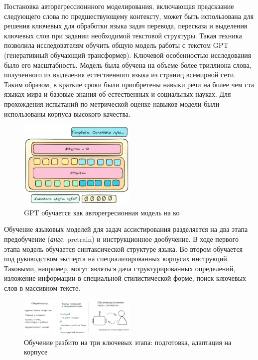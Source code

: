 Постановка авторегрессионнного моделирования, включающая предскзание следующего слова по предшествующему контексту,
может быть использована для решения ключевых для обработки языка задач перевода, пересказа и выделения ключевых слов
при задании необходимой текстовой структуры. Такая техника позволила исследователям \cite{radford2021learning} обучить
общую модель работы с текстом GPT (генеративный обучающий трансформер). Ключевой особенностью исследования было его
масштабность. Модель была обучена на объеме более триллиона слова, полученного из выделения естественного языка из страниц всемирной сети.
Таким образом, в краткие сроки были приобретены навыки речи на более чем ста языках мира и базовые знания об естественных и социальных науках.
Для прохождения испытаний по метрической оценке навыков модели были использованы корпуса высокого качества. 


\begin{figure}[h]
    \centering
    \includegraphics[width=0.5\textwidth]{assets/ml/nlp/gpt.excalidraw.png}
    \caption{GPT обучается как авторегресионная модель на ко}
    \label{gpt}
\end{figure}

Обучение языковых моделей для задач ассистирования разделяется на два этапа предобучение (\textit{англ.} pretrain) и инструкционное дообучение.
В ходе первого этапа модель обучается синтаксической структуре языка. 
Во втором обучается под руководством эксперта на специализированных корпусах инструкций. Таковыми, например, могут являться
дача структурированных определений, изложение информации в специальной стилистической форме, поиск ключевых слов в массивном тексте.

\begin{figure}[h]
    \centering
    \includegraphics[width=0.5\textwidth]{assets/work/arch/learning.excalidraw.png}
    \caption{Обучение разбито на три ключевых этапа: подготовка, адаптация на корпусе}
    \label{train}
\end{figure}

